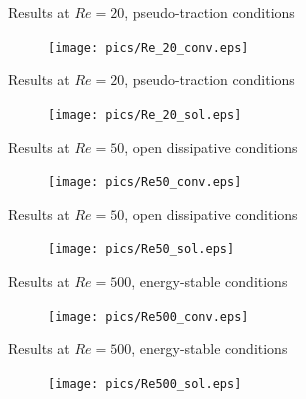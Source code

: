 \documentclass{beamer}
\begin{document}
\begin{frame}{Results at $Re=20$, pseudo-traction conditions}

	\begin{figure}
		\texttt{[image: pics/Re\_20\_conv.eps]}
	\end{figure}

\end{frame}

\begin{frame}{Results at $Re=20$, pseudo-traction conditions}

	\begin{figure}
		\texttt{[image: pics/Re\_20\_sol.eps]}
	\end{figure}

\end{frame}

\begin{frame}{Results at $Re=50$, open dissipative conditions}

	\begin{figure}
		\texttt{[image: pics/Re50\_conv.eps]}
	\end{figure}

\end{frame}

\begin{frame}{Results at $Re=50$, open dissipative conditions}

	\begin{figure}
		\texttt{[image: pics/Re50\_sol.eps]}
	\end{figure}

\end{frame}

\begin{frame}{Results at $Re=500$, energy-stable conditions}

	\begin{figure}
		\texttt{[image: pics/Re500\_conv.eps]}
	\end{figure}

\end{frame}

\begin{frame}{Results at $Re=500$, energy-stable conditions}

	\begin{figure}
		\texttt{[image: pics/Re500\_sol.eps]}
	\end{figure}

\end{frame}
\end{document}
